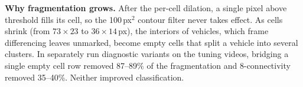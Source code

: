 \textbf{Why fragmentation grows.} After the per-cell dilation, a single
pixel above threshold fills its cell, so the 100\,px$^2$ contour filter
never takes effect. As cells shrink (from $73{\times}23$ to
$36{\times}14$\,px), the interiors of vehicles, which frame differencing
leaves unmarked, become empty cells that split a vehicle into several
clusters. In separately run diagnostic variants on the tuning videos,
bridging a single empty cell row removed 87--89\% of the fragmentation and
8-connectivity removed 35--40\%. Neither improved classification.

